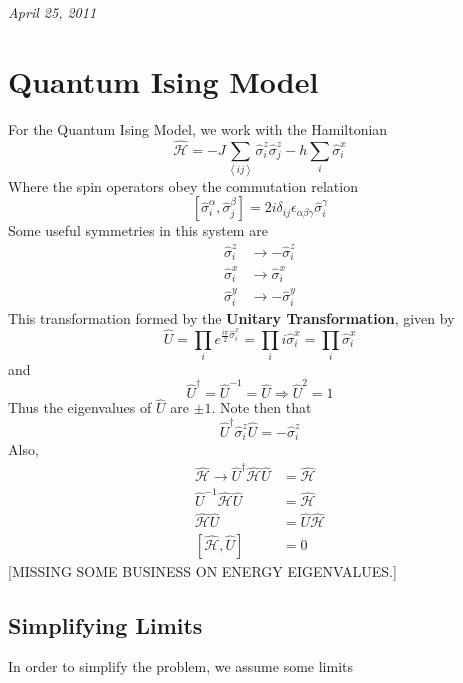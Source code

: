 \documentclass{article}
\begin{document}
	\textit{April 25, 2011}\\
	
	\section{Quantum Ising Model}
	For the Quantum Ising Model, we work with the Hamiltonian
	\begin{equation} \label{quantumIsing} \hat{\mathcal{H}}=-J\sum_{\left<ij\right>}\hat{\sigma}_i^z\hat{\sigma}_j^z-h\sum_i\hat{\sigma}_i^x\end{equation}
	Where the spin operators obey the commutation relation
	\begin{equation} \label{spinComm} \left[\hat{\sigma}_i^\alpha,\hat{\sigma}_j^\beta\right]=2i\delta_{ij}\epsilon_{\alpha\beta\gamma}\hat{\sigma}_i^\gamma \end{equation}
	Some useful symmetries in this system are
	\begin{align*}
		\hat{\sigma}_i^z&\longrightarrow -\hat{\sigma}_i^z\\
		\hat{\sigma}_i^x&\longrightarrow \hat{\sigma}_i^x\\
		\hat{\sigma}_i^y&\longrightarrow -\hat{\sigma}_i^y
	\end{align*}	
	This transformation formed by the \textbf{Unitary Transformation}, given by
	$$\hat{U}=\prod_i e^{\frac{i\pi}{2}\hat{\sigma}_i^x}=\prod_i i\hat{\sigma}_i^x=\prod_i \hat{\sigma}_i^x$$
	and
	$$\hat{U}^\dag=\hat{U}^{-1}=\hat{U}\Rightarrow \hat{U}^2=1$$
	Thus the eigenvalues of $\hat{U}$ are $\pm 1$. Note then that
	$$\hat{U}^\dag \hat{\sigma}^z_i\hat{U}=-\hat{\sigma}_i^z$$
	Also,
	\begin{align*}
		\hat{\mathcal{H}}\longrightarrow \hat{U}^\dag \hat{\mathcal{H}}\hat{U}&=\hat{\mathcal{H}}\\
		\hat{U}^{-1}\hat{\mathcal{H}}\hat{U}&=\hat{\mathcal{H}}\\
		\hat{\mathcal{H}}\hat{U}&=\hat{U}\hat{\mathcal{H}}\\
		 \left[\hat{\mathcal{H}},\hat{U}\right]&=0
	\end{align*}
	[MISSING SOME BUSINESS ON ENERGY EIGENVALUES.]\\
	
	\subsection{Simplifying Limits}
	In order to simplify the problem, we assume some limits
\end{document}
